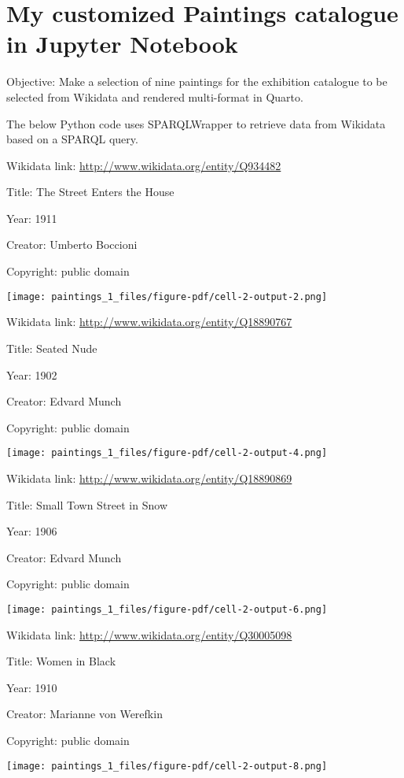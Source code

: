 \documentclass[
  letterpaper,
]{book}
\begin{document}

\hypertarget{my-customized-paintings-catalogue-in-jupyter-notebook}{%
\chapter{My customized Paintings catalogue in Jupyter
Notebook}\label{my-customized-paintings-catalogue-in-jupyter-notebook}}

Objective: Make a selection of nine paintings for the exhibition
catalogue to be selected from Wikidata and rendered multi-format in
Quarto.

The below Python code uses SPARQLWrapper to retrieve data from Wikidata
based on a SPARQL query.

Wikidata link: \url{http://www.wikidata.org/entity/Q934482}

Title: The Street Enters the House

Year: 1911

Creator: Umberto Boccioni

Copyright: public domain

\texttt{[image: paintings\_1\_files/figure-pdf/cell-2-output-2.png]}

Wikidata link: \url{http://www.wikidata.org/entity/Q18890767}

Title: Seated Nude

Year: 1902

Creator: Edvard Munch

Copyright: public domain

\texttt{[image: paintings\_1\_files/figure-pdf/cell-2-output-4.png]}

Wikidata link: \url{http://www.wikidata.org/entity/Q18890869}

Title: Small Town Street in Snow

Year: 1906

Creator: Edvard Munch

Copyright: public domain

\texttt{[image: paintings\_1\_files/figure-pdf/cell-2-output-6.png]}

Wikidata link: \url{http://www.wikidata.org/entity/Q30005098}

Title: Women in Black

Year: 1910

Creator: Marianne von Werefkin

Copyright: public domain

\texttt{[image: paintings\_1\_files/figure-pdf/cell-2-output-8.png]}
\end{document}
